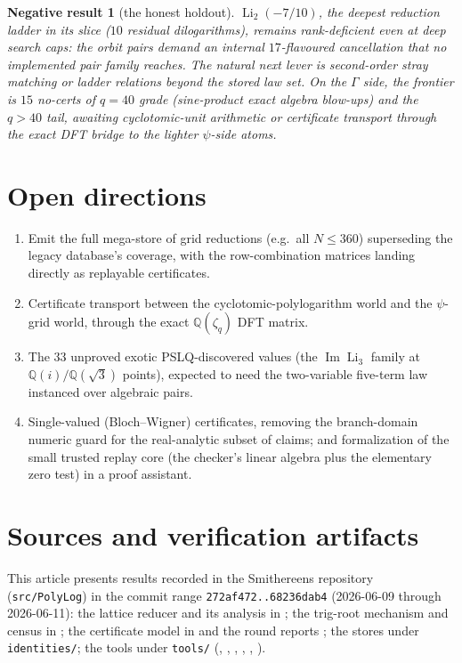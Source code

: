 \documentclass[11pt]{article}
\newtheorem{negative}[result]{Negative result}
\theoremstyle{remark}
\newcommand{\Li}{\operatorname{Li}}
\begin{document}
\begin{negative}[the honest holdout]\label{neg:holdout}
$\Li_2(-7/10)$, the deepest reduction ladder in its slice ($10$ residual dilogarithms),
remains rank-deficient even at deep search caps: the orbit pairs demand an internal
$17$-flavoured cancellation that no implemented pair family reaches. The natural next
lever is second-order stray matching or ladder relations beyond the stored law set.
On the $\Gamma$ side, the frontier is $15$ no-certs of $q=40$ grade (sine-product exact
algebra blow-ups) and the $q>40$ tail, awaiting cyclotomic-unit arithmetic or certificate
transport through the exact DFT bridge to the lighter $\psi$-side atoms.
\end{negative}

\section{Open directions}\label{sec:open}

\begin{enumerate}
\item Emit the full mega-store of grid reductions (e.g.\ all $N\le360$) superseding the
legacy database's coverage, with the row-combination matrices landing directly as
replayable certificates.
\item Certificate transport between the cyclotomic-polylogarithm world and the
$\psi$-grid world, through the exact $\mathbb{Q}(\zeta_q)$ DFT matrix.
\item The $33$ unproved exotic PSLQ-discovered values (the $\operatorname{Im}\Li_3$ family
at $\mathbb{Q}(i)/\mathbb{Q}(\sqrt3)$ points), expected to need the two-variable five-term
law instanced over algebraic pairs.
\item Single-valued (Bloch--Wigner) certificates, removing the branch-domain numeric guard
for the real-analytic subset of claims; and formalization of the small trusted replay core
(the checker's linear algebra plus the elementary zero test) in a proof assistant.
\end{enumerate}

\section*{Sources and verification artifacts}

This article presents results recorded in the Smithereens repository
(\texttt{src/PolyLog}) in the commit range \texttt{272af472..68236dab4} (2026-06-09
through 2026-06-11): the lattice reducer and its analysis in
; the
trig-root mechanism and census in
; the certificate model
in  and the round reports
; the stores
under \texttt{identities/}; the tools under \texttt{tools/}
(, , ,
, , ).
\end{document}
